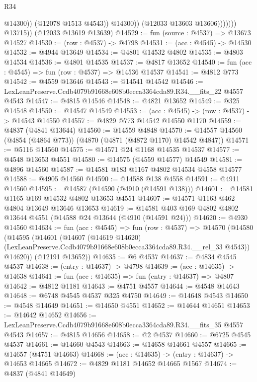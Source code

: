 \begin{lexlean}{R34}
\begin{coremodule}
                              @14300))
                          (@12078 @1513 @4543))
                        @14300))
                    (@12033 @13603 @13606)))))))
        @13715))
    (@12033 @13619 @13639)
@14529 := fun (source : @4537) => @13673 @14527
@14530 := (row : @4537) -> @4798
@14531 := (acc : @4545) -> @14530
@14532 := @4944 @13649
@14534 := @4801 @14532 @4802
@14535 := @4803 @14534
@14536 := @4801 @14535
@14537 := @4817 @13652
@14540 := fun (acc : @4545) => fun (row : @4537) => @14536 @14537
@14541 := @4812 @773
@14542 := @4559 @13646
@14543 := @14541 @14542
@14546 := LexLeanPreserve.Ccdb4079b91668e608b0ecca3364cda89.R34.__fits_22 @4557 @4543
@14547 := @4815 @14546
@14548 := @4821 @13652
@14549 := @325 @14548
@14550 := @14547 @14549
@14553 := (acc : @4545) -> (row : @4537) -> @14543 @14550
@14557 := @4829 @773 @14542 @14550 @1170
@14559 := @4837 (@4841 @13644)
@14560 := @14559 @4848
@14570 := @14557 @14560 (@4854 (@4864 @773)) (@4870 (@4871 (@4872 @1170) @14542 @4847))
@14571 := @5116 @14560
@14575 := @14571 @24 @1168 @14535 @14537
@14577 := @4548 @13653 @4551
@14580 := @14575 (@4559 @14577) @14549
@14581 := @4896 @14560
@14587 := @14581 @183 @1167 @4802 @14534 @4558 @14577
@14588 := @4905 @14560
@14590 := @14588 @138 @4558
@14591 := @4911 @14560
@14595 := @14587 (@14590 (@4910 (@14591 @138)))
@14601 := @14581 @1165 @169 @14532 @4802 @13653 @4551
@14607 := @14571 @1163 @462 @4804 @13649 @13646 @13653
@14619 := @14581 @403 @169 @4802 @4802 @13644 @4551 (@14588 @24 @13644 (@4910 (@14591 @24)))
@14620 := @4930 @14560
@14634 := fun (acc : @4545) =>
  fun (row : @4537) =>
  @14570
    (@14580
      (@14595
        (@14601
          (@14607
            (@14619 @14620)
            (LexLeanPreserve.Ccdb4079b91668e608b0ecca3364cda89.R34.__rel_33 @4543))
          @14620))
      (@12191 @13652))
@14635 := @6 @4537
@14637 := @4834 @4545 @4537
@14638 := (entry : @14637) -> @4798
@14639 := (acc : @14635) -> @14638
@14641 := fun (acc : @14635) => fun (entry : @14637) => @4807
@14642 := @4812 @1181
@14643 := @4751 @4557
@14644 := @4548 @14643
@14648 := @6748 @4545 @4537 @325 @4750
@14649 := @14648 @4543
@14650 := @4548 @14649
@14651 := @14650 @4551
@14652 := @14644 @14651
@14653 := @14642 @14652
@14656 := LexLeanPreserve.Ccdb4079b91668e608b0ecca3364cda89.R34.__fits_35 @4557 @4543
@14657 := @4815 @14656
@14658 := @2 @4537
@14660 := @6725 @4545 @4537
@14661 := @14660 @4543
@14663 := @14658 @14661 @4557
@14665 := @14657 (@4751 @14663)
@14668 := (acc : @14635) -> (entry : @14637) -> @14653 @14665
@14672 := @4829 @1181 @14652 @14665 @1567
@14674 := @4837 (@4841 @14649)

\end{coremodule}
\end{lexlean}
